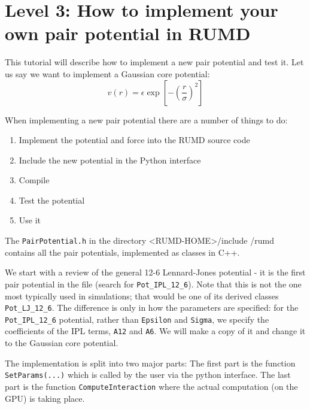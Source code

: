 \section{Level 3: How to implement your own pair potential in RUMD}

%
This tutorial will describe how to implement a new pair potential and
test it. Let us say we want to implement a Gaussian core potential: 
\begin{equation}
v(r) = \epsilon \exp\left[ -\left( \frac{r}{\sigma} \right)^2 \right]
\end{equation}


When implementing a new pair potential there are a number of things to do:
\begin{enumerate}
  \item Implement the potential and force into the RUMD source code
  \item Include the new potential in the Python interface 
  \item Compile
  \item Test the potential
  \item Use it
\end{enumerate}

The \verb|PairPotential.h| in the directory <RUMD-HOME>/include /rumd
contains all the pair potentials, implemented as classes in C++. 

We start with a review of the general 12-6 Lennard-Jones potential - it is 
the first pair potential in the file (search for \verb|Pot_IPL_12_6|). Note
that this is not the one most typically used in simulations; that would be
one of its derived classes \verb|Pot_LJ_12_6|. The difference is only in how
the parameters are specified: for the \verb|Pot_IPL_12_6| potential, rather
than \verb|Epsilon| and \verb|Sigma|, we specify the coefficients of the IPL
terms, \verb|A12| and \verb|A6|. We will 
make a copy of it and change it to the Gaussian core potential. 

The implementation is split into two major parts: The first part is the 
function \verb|SetParams(...)| which is called by the user via the 
python interface. The last part is the function \verb|ComputeInteraction| 
where the actual  computation (on the GPU) is taking place. 


